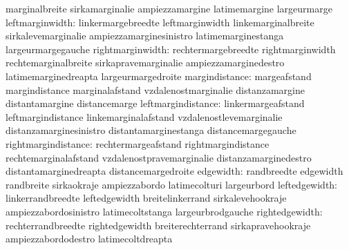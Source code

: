                                   marginalbreite                   sirkamarginalie
                                  ampiezzamargine                  latimemargine
                                  largeurmarge
                 leftmarginwidth: linkermargebreedte               leftmarginwidth
                                  linkemarginalbreite              sirkalevemarginalie
                                  ampiezzamarginesinistro          latimemarginestanga
                                  largeurmargegauche
                rightmarginwidth: rechtermargebreedte              rightmarginwidth
                                  rechtemarginalbreite             sirkapravemarginalie
                                  ampiezzamarginedestro            latimemarginedreapta
                                  largeurmargedroite
                  margindistance: margeafstand                     margindistance
                                  marginalafstand                  vzdalenostmarginalie
                                  distanzamargine                  distantamargine
                                  distancemarge
              leftmargindistance: linkermargeafstand               leftmargindistance
                                  linkemarginalafstand             vzdalenostlevemarginalie
                                  distanzamarginesinistro          distantamarginestanga
                                  distancemargegauche
             rightmargindistance: rechtermargeafstand              rightmargindistance
                                  rechtemarginalafstand            vzdalenostpravemarginalie
                                  distanzamarginedestro            distantamarginedreapta
                                  distancemargedroite
                       edgewidth: randbreedte                      edgewidth
                                  randbreite                       sirkaokraje
                                  ampiezzabordo                    latimecolturi
                                  largeurbord
                   leftedgewidth: linkerrandbreedte                leftedgewidth
                                  breitelinkerrand                 sirkalevehookraje
                                  ampiezzabordosinistro            latimecoltstanga
                                  largeurbrodgauche
                  rightedgewidth: rechterrandbreedte               rightedgewidth
                                  breiterechterrand                sirkapravehookraje
                                  ampiezzabordodestro              latimecoltdreapta
